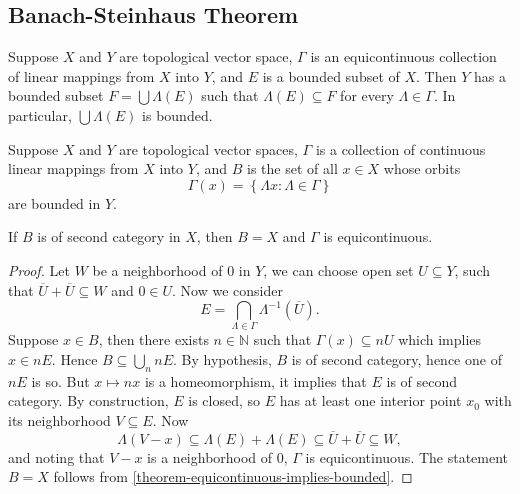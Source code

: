 \subsection{Banach-Steinhaus Theorem}
\label{subsection-Banach-Steinhaus-theorem}

\begin{theorem}
  \label{theorem-equicontinuous-implies-bounded}
  Suppose \( X \) and \( Y \) are topological vector space, \( \Gamma \) is an equicontinuous collection of linear mappings from \( X \) into \( Y \), and \( E \) is a bounded subset of \( X \).
  Then \( Y \) has a bounded subset \( F = \bigcup \Lambda(E) \) such that \( \Lambda(E) \subseteq F \) for every \( \Lambda \in \Gamma \).
  In particular, \( \bigcup \Lambda(E) \) is bounded.
\end{theorem}

\begin{theorem}
  \label{theorem-Banach-Steinhaus-theorem}
  Suppose \( X \) and \( Y \) are topological vector spaces, \( \Gamma \) is a collection of continuous linear mappings from \( X \) into \( Y \), and \( B \) is the set of all \( x \in X \) whose orbits
  \[
    \Gamma(x) = \left\lbrace \Lambda x: \Lambda \in \Gamma \right\rbrace
  \]
  are bounded in \( Y \).

  If \( B \) is of second category in \( X \), then \( B = X \) and \( \Gamma \) is equicontinuous.
\end{theorem}
\begin{proof}
  Let \( W \) be a neighborhood of \( 0 \) in \( Y \), we can choose open set \( U \subseteq Y \), such that \( \overline{U} + \overline{U} \subseteq W \) and \( 0 \in U \).
  Now we consider
  \[
    E = \bigcap_{\Lambda \in \Gamma}\Lambda^{-1}(\overline{U}).
  \]
  Suppose \( x \in B \), then there exists \( n \in \mathbb{N} \) such that \( \Gamma(x) \subseteq n U \) which implies \( x \in n E \).
  Hence \( B \subseteq \bigcup_{n}nE \).
  By hypothesis, \( B \) is of second category, hence one of \( n E \) is so.
  But \( x \mapsto nx \) is a homeomorphism, it implies that \( E \) is of second category.
  By construction, \( E \) is closed, so \( E \) has at least one interior point \( x_0 \) with its neighborhood \( V \subseteq E \).
  Now
  \[
    \Lambda(V - x) \subseteq \Lambda(E) + \Lambda(E) \subseteq \overline{U} + \overline{U} \subseteq W,
  \]
  and noting that \( V - x \) is a neighborhood of \( 0 \), \( \Gamma \) is equicontinuous.
  The statement \( B = X \) follows from \ref{theorem-equicontinuous-implies-bounded}.
\end{proof}

